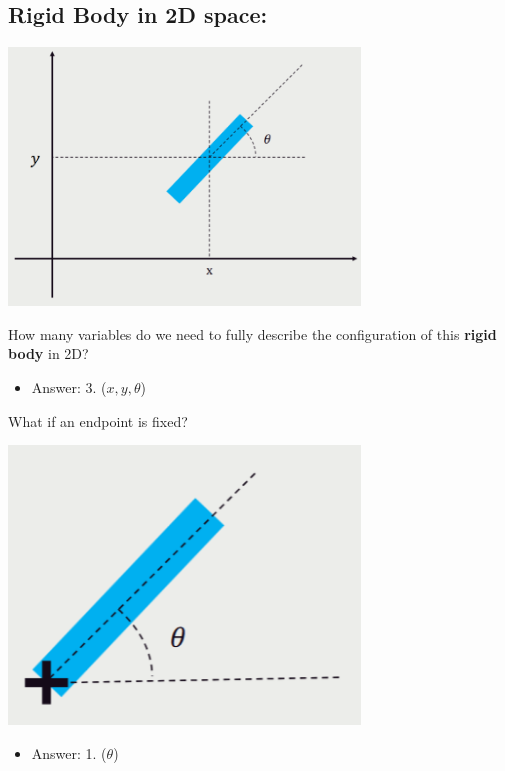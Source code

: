 \documentclass[10pt]{article}
\begin{document}
\subsection*{Rigid Body in 2D space:}
\begin{center} 
	\includegraphics*[width=0.7\textwidth]{L2_1.png} 
\end{center}
How many variables do we need to fully describe the configuration of this \textbf{rigid body} in 2D?
\begin{itemize}
	\item Answer: 3.  ($x, y, \theta$)
\end{itemize}
What if an endpoint is fixed?
\begin{center} 
	\includegraphics*[width=0.7\textwidth]{L2_2.png} 
\end{center}
\begin{itemize}
	\item Answer: 1.  ($\theta$)
\end{itemize}
\end{document}
